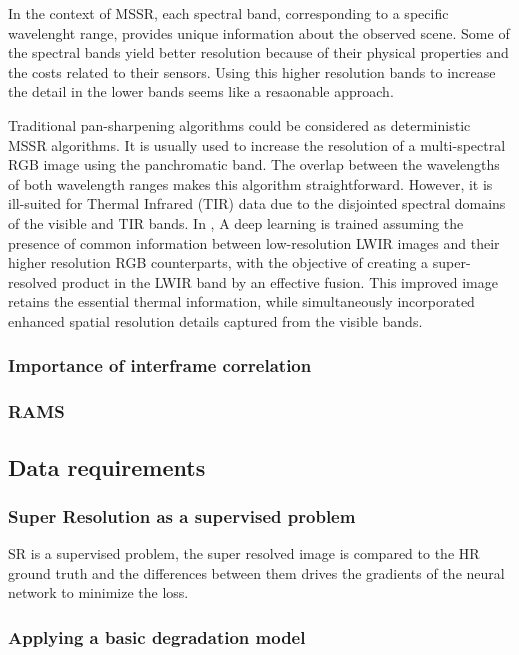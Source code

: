         In the context of MSSR, each spectral band, corresponding to a specific wavelenght range, provides unique information about the observed scene. Some of the spectral bands yield better resolution because of their physical properties and the costs related to their sensors. Using this higher resolution bands to increase the detail in the lower bands seems like a resaonable approach.

        Traditional pan-sharpening algorithms could be considered as deterministic MSSR  algorithms. It is usually used to increase the resolution of a multi-spectral RGB image using the panchromatic band. The overlap between the wavelengths of both wavelength ranges makes this algorithm straightforward. However, it is ill-suited for Thermal Infrared (TIR) data due to the disjointed spectral domains of the visible and TIR bands. In \cite{myself2023}, A deep learning is trained assuming the presence of common information between low-resolution LWIR images and their higher resolution RGB counterparts, with the objective of creating a super-resolved product in the LWIR band by an effective fusion. This improved image retains the essential thermal information, while simultaneously incorporated enhanced spatial resolution details captured from the visible bands. 

        \subsubsection{Importance of interframe correlation}
        \subsubsection{RAMS}
    \subsection{Data requirements}
        \subsubsection{Super Resolution as a supervised problem}      

        SR is a supervised problem, the super resolved image is compared to the HR ground truth and the differences between them drives the gradients of the neural network to minimize the loss.
        \subsubsection{Applying a basic degradation model}

